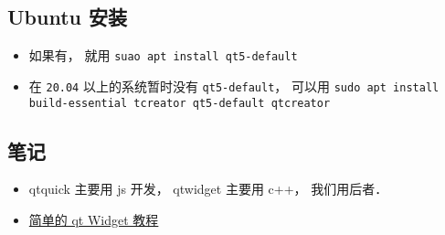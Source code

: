 
\subsection{Ubuntu 安装}
\begin{itemize}
\item 如果有， 就用 \verb|suao apt install qt5-default|
\item 在 \verb|20.04| 以上的系统暂时没有 \verb|qt5-default|， 可以用 \verb|sudo apt install build-essential tcreator qt5-default qtcreator|
\end{itemize}

\subsection{笔记}
\begin{itemize}
\item qtquick 主要用 js 开发，  qtwidget 主要用 c++， 我们用后者．
\item \href{https://doc.qt.io/qt-5/qtwidgets-tutorials-notepad-example.html}{简单的 qt Widget 教程}
\end{itemize}
